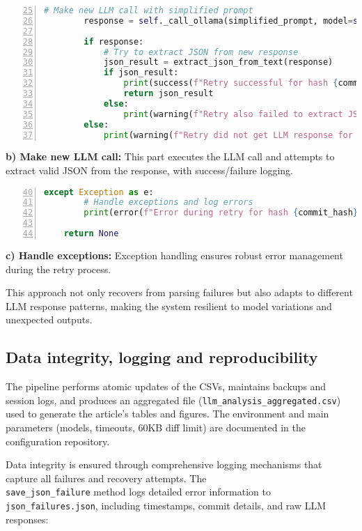 \begin{lstlisting}[language=Python, numbers=left, firstnumber=25]
        # Make new LLM call with simplified prompt
        response = self._call_ollama(simplified_prompt, model=self.model, attempts=2)
        
        if response:
            # Try to extract JSON from new response
            json_result = extract_json_from_text(response)
            if json_result:
                print(success(f"Retry successful for hash {commit_hash}"))
                return json_result
            else:
                print(warning(f"Retry also failed to extract JSON for hash {commit_hash}"))
        else:
            print(warning(f"Retry did not get LLM response for hash {commit_hash}"))
\end{lstlisting}

\textbf{b) Make new LLM call:} This part executes the LLM call and attempts to extract valid JSON from the response, with success/failure logging.

\begin{lstlisting}[language=Python, numbers=left, firstnumber=40]
    except Exception as e:
        # Handle exceptions and log errors
        print(error(f"Error during retry for hash {commit_hash}: {e}"))
        
    return None
\end{lstlisting}

\textbf{c) Handle exceptions:} Exception handling ensures robust error management during the retry process.

This approach not only recovers from parsing failures but also adapts to different LLM response patterns, making the system resilient to model variations and unexpected outputs.

% 

\subsection{Data integrity, logging and reproducibility}
The pipeline performs atomic updates of the CSVs, maintains backups and session logs, and produces an aggregated file (\texttt{llm\_analysis\_\allowbreak aggregated.csv}) used to generate the article's tables and figures. The environment and main parameters (models, timeouts, 60KB diff limit) are documented in the configuration repository.

Data integrity is ensured through comprehensive logging mechanisms that capture all failures and recovery attempts. The \\ \texttt{save\_json\_failure} method logs detailed error information to \texttt{json\_failures.json}, including timestamps, commit details, and raw LLM responses:


